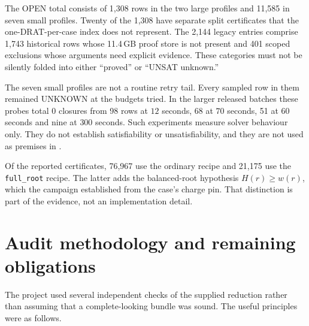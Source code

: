 \documentclass[11pt]{article}
\theoremstyle{definition}
\theoremstyle{remark}
\begin{document}
The OPEN total consists of 1,308 rows in the two large profiles and 11,585 in
seven small profiles.  Twenty of the 1,308 have separate split certificates
that the one-DRAT-per-case index does not represent.  The 2,144 legacy entries
comprise 1,743 historical rows whose 11.4\,GB proof store is not present and
401 scoped exclusions whose arguments need explicit evidence.  These categories
must not be silently folded into either ``proved'' or ``UNSAT unknown.''

The seven small profiles are not a routine retry tail.  Every sampled row in
them remained UNKNOWN at the budgets tried.  In the larger released batches
these probes total 0 closures from 98 rows at $12$ seconds, 68 at $70$ seconds,
51 at $60$ seconds and nine at $300$ seconds.  Such experiments measure solver
behaviour only.  They do not establish satisfiability or unsatisfiability, and
they are not used as premises in .

Of the reported certificates, 76,967 use the ordinary recipe and 21,175 use
the \texttt{full\_root} recipe.  The latter adds the balanced-root hypothesis
$H(r)\geq w(r)$, which the campaign established from the case's charge pin.
That distinction is part of the evidence, not an implementation detail.

\section{Audit methodology and remaining obligations}\label{sec:audit}

The project used several independent checks of the supplied reduction rather
than assuming that a complete-looking bundle was sound.  The useful principles
were as follows.
\end{document}
